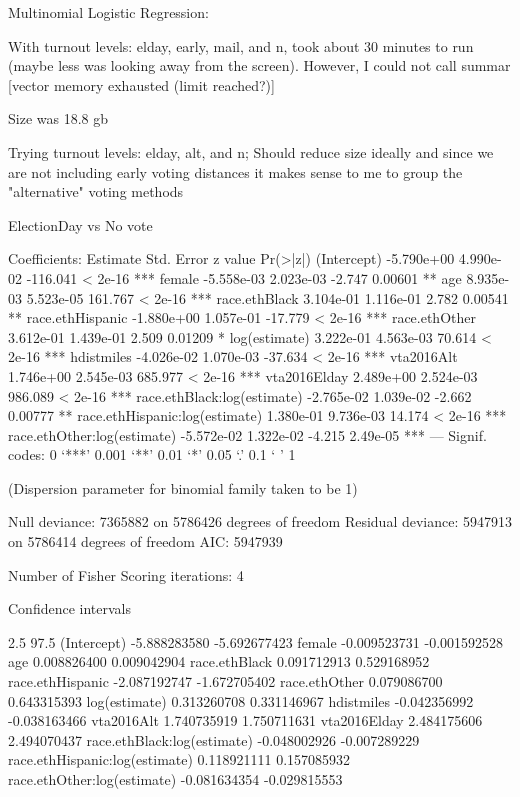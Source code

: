 Multinomial Logistic Regression:

With turnout levels: elday, early, mail, and n,
took about 30 minutes to run (maybe less was looking away from the screen).
However, I could not call summar [vector memory exhausted (limit reached?)]

Size was 18.8 gb

Trying turnout levels: elday, alt, and n;
Should reduce size ideally and since we are not including early voting distances
it makes sense to me to group the "alternative" voting methods



ElectionDay vs No vote

Coefficients:
                                 Estimate Std. Error  z value Pr(>|z|)
(Intercept)                    -5.790e+00  4.990e-02 -116.041  < 2e-16 ***
female                         -5.558e-03  2.023e-03   -2.747  0.00601 **
age                             8.935e-03  5.523e-05  161.767  < 2e-16 ***
race.ethBlack                   3.104e-01  1.116e-01    2.782  0.00541 **
race.ethHispanic               -1.880e+00  1.057e-01  -17.779  < 2e-16 ***
race.ethOther                   3.612e-01  1.439e-01    2.509  0.01209 *
log(estimate)                   3.222e-01  4.563e-03   70.614  < 2e-16 ***
hdistmiles                     -4.026e-02  1.070e-03  -37.634  < 2e-16 ***
vta2016Alt                      1.746e+00  2.545e-03  685.977  < 2e-16 ***
vta2016Elday                    2.489e+00  2.524e-03  986.089  < 2e-16 ***
race.ethBlack:log(estimate)    -2.765e-02  1.039e-02   -2.662  0.00777 **
race.ethHispanic:log(estimate)  1.380e-01  9.736e-03   14.174  < 2e-16 ***
race.ethOther:log(estimate)    -5.572e-02  1.322e-02   -4.215 2.49e-05 ***
---
Signif. codes:  0 ‘***’ 0.001 ‘**’ 0.01 ‘*’ 0.05 ‘.’ 0.1 ‘ ’ 1

(Dispersion parameter for binomial family taken to be 1)

    Null deviance: 7365882  on 5786426  degrees of freedom
Residual deviance: 5947913  on 5786414  degrees of freedom
AIC: 5947939

Number of Fisher Scoring iterations: 4


Confidence intervals

                                    2.5       97.5
(Intercept)                    -5.888283580 -5.692677423
female                         -0.009523731 -0.001592528
age                             0.008826400  0.009042904
race.ethBlack                   0.091712913  0.529168952
race.ethHispanic               -2.087192747 -1.672705402
race.ethOther                   0.079086700  0.643315393
log(estimate)                   0.313260708  0.331146967
hdistmiles                     -0.042356992 -0.038163466
vta2016Alt                      1.740735919  1.750711631
vta2016Elday                    2.484175606  2.494070437
race.ethBlack:log(estimate)    -0.048002926 -0.007289229
race.ethHispanic:log(estimate)  0.118921111  0.157085932
race.ethOther:log(estimate)    -0.081634354 -0.029815553

